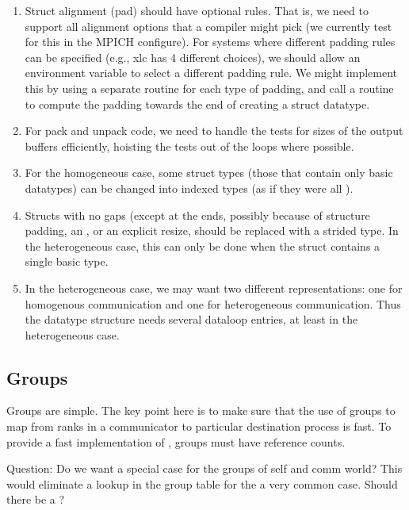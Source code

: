 \documentclass{article}
\begin{document}
\begin{enumerate}
\item Struct alignment (pad) should have optional rules.  That is, we
   need to support all alignment options that a compiler might pick
   (we currently test for this in the MPICH configure).  For systems
   where different padding rules can be specified (e.g., xlc has 4
   different choices), we should allow an environment variable to
   select a different padding rule.  We might implement this by using
   a separate routine for each type of padding, and call a routine to
   compute the padding towards the end of creating a struct datatype.

\item For pack and unpack code, we need to handle the tests for sizes of
    the output buffers efficiently, hoisting the tests out of the
    loops where possible.  

\item For the homogeneous case, some struct types (those that contain
    only basic datatypes) can be changed into indexed types (as if
    they were all ).

\item Structs with no gaps (except at the ends, possibly because of 
    structure padding, an , or an explicit resize,
    should be replaced with a strided type.  In the heterogeneous
    case, this can only be done when the struct contains a single
    basic type.

\item In the heterogeneous case, we may want two different
    representations: one for homogenous communication and one for
    heterogeneous communication.  Thus the datatype structure needs
    several dataloop entries, at least in the heterogeneous case.

\end{enumerate}

\subsection{Groups}

Groups are simple.  The key point here is to make sure that the use of
groups to map from ranks in a communicator to particular destination
process is fast.
To provide a fast implementation of , groups must
have reference counts.  

Question: Do we want a special case for the groups of self and comm
world?  This would eliminate a lookup in the group table for the a very
common case.  Should there be a ?  
\end{document}
